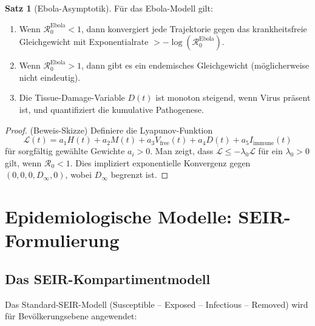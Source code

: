 ﻿\documentclass[a4paper,12pt]{article}
\theoremstyle{definition}
\newtheorem{satz}{Satz}
\begin{document}
\begin{satz}[Ebola-Asymptotik]
Für das Ebola-Modell gilt:
\begin{enumerate}
\item Wenn $\mathcal{R}_0^{\text{Ebola}} < 1$, dann konvergiert jede Trajektorie gegen das krankheitsfreie Gleichgewicht mit Exponentialrate $> -\log(\mathcal{R}_0^{\text{Ebola}})$.
\item Wenn $\mathcal{R}_0^{\text{Ebola}} > 1$, dann gibt es ein endemisches Gleichgewicht (möglicherweise nicht eindeutig).
\item Die Tissue-Damage-Variable $D(t)$ ist monoton steigend, wenn Virus präsent ist, und quantifiziert die kumulative Pathogenese.
\end{enumerate}
\end{satz}

\begin{proof}
(Beweis-Skizze) Definiere die Lyapunov-Funktion
\[
\mathcal{L}(t) = a_1 H(t) + a_2 M(t) + a_3 V_{\text{free}}(t) + a_4 D(t) + a_5 I_{\text{immune}}(t)
\]
für sorgfältig gewählte Gewichte $a_i > 0$. Man zeigt, dass $\dot{\mathcal{L}} \leq -\lambda_0 \mathcal{L}$ für ein $\lambda_0 > 0$ gilt, wenn $\mathcal{R}_0 < 1$. Dies impliziert exponentielle Konvergenz gegen $(0, 0, 0, D_\infty, 0)$, wobei $D_\infty$ begrenzt ist.
\end{proof}

\section{Epidemiologische Modelle: SEIR-Formulierung}

\subsection{Das SEIR-Kompartimentmodell}

Das Standard-SEIR-Modell (Susceptible -- Exposed -- Infectious -- Removed) wird für Bevölkerungsebene angewendet:
\end{document}
